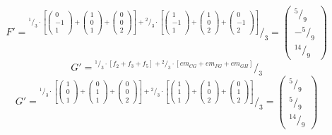 \documentclass{article}
\newcommand*\rfrac[2]{{}^{#1}\!/_{#2}}%
\begin{document}
\[F'=\rfrac{\rfrac{1}{3}\cdot\left[
\left({\begin{array}{c} 0 \\  -1 \\ 1 \end{array}}\right)+
\left({\begin{array}{c} 1 \\  0 \\ 1 \end{array}}\right)+
\left({\begin{array}{c} 0 \\  0 \\ 2 \end{array}}\right)\right]+
\rfrac{2}{3}\cdot\left[
\left({\begin{array}{c} 1 \\  -1 \\ 1 \end{array}}\right)+
\left({\begin{array}{c} 1 \\  0 \\ 2 \end{array}}\right)+
\left({\begin{array}{c} 0 \\  -1 \\ 2 \end{array}}\right)\right]
}{3}=\left({\begin{array}{c} \rfrac{5}{9} \\  -\rfrac{5}{9} \\ \rfrac{14}{9} \end{array}}\right)\]
\[G'=\rfrac{\rfrac{1}{3}\cdot\left[f_2+f_3+f_5\right]+
\rfrac{2}{3}\cdot\left[em_{CG}+em_{FG}+em_{GH}\right]
}{3}\]
\[G'=\rfrac{\rfrac{1}{3}\cdot\left[
\left({\begin{array}{c} 1 \\  0 \\ 1 \end{array}}\right)+
\left({\begin{array}{c} 0 \\  1 \\ 1 \end{array}}\right)+
\left({\begin{array}{c} 0 \\  0 \\ 2 \end{array}}\right)\right]+
\rfrac{2}{3}\cdot\left[
\left({\begin{array}{c} 1 \\  1 \\ 1 \end{array}}\right)+
\left({\begin{array}{c} 1 \\  0 \\ 2 \end{array}}\right)+
\left({\begin{array}{c} 0 \\  1 \\ 2 \end{array}}\right)\right]
}{3}=\left({\begin{array}{c} \rfrac{5}{9} \\  \rfrac{5}{9} \\ \rfrac{14}{9} \end{array}}\right)\]
\end{document}
